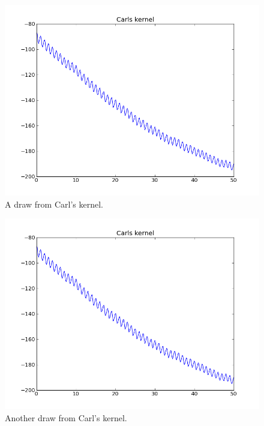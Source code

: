 \documentclass[twoside]{article}
\begin{document}
\begin{figure}[h]
\includegraphics[width=\columnwidth]{../figures/carls_kernel_draw1}
\caption{A draw from Carl's kernel.}
\end{figure}

\begin{figure}[h]
\includegraphics[width=\columnwidth]{../figures/carls_kernel_draw1}
\caption{Another draw from Carl's kernel.}
\end{figure}
\end{document}
